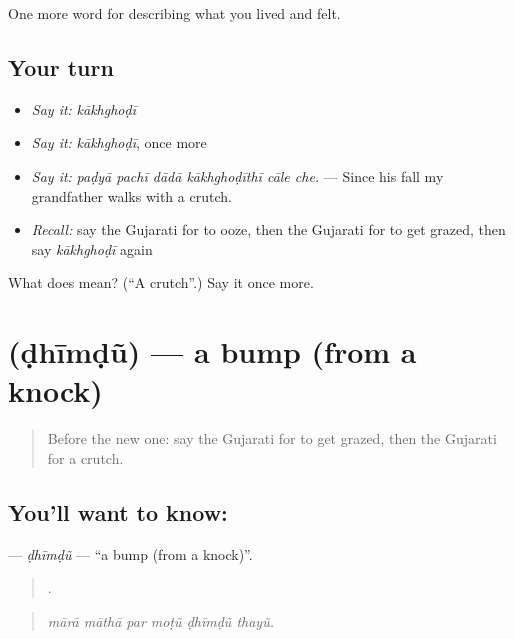 \begin{grammarlens}[title={What you've built}]
One more word for describing what you lived and felt.
\end{grammarlens}

\subsection*{Your turn}
\begin{itemize}
\raggedright
  \item \emph{Say it:} \emph{kākhghoḍī}
  \item \emph{Say it:} \emph{kākhghoḍī}, once more
  \item \emph{Say it:} \emph{paḍyā pachī dādā kākhghoḍīthī cāle che.} — Since his fall my grandfather walks with a crutch.
  \item \emph{Recall:} say the Gujarati for to ooze, then the Gujarati for to get grazed, then say \emph{kākhghoḍī} again
\end{itemize}

\begin{tcolorbox}[breakable,colback=teal!4,colframe=teal!35!black,title={Before you move on}]
What does  mean? (\textquotedblleft{}A crutch\textquotedblright{}.) Say it once more.
\end{tcolorbox}
\section[\texorpdfstring{\gu{ઢીમડું} (ḍhīmḍũ)}{ઢીમડું (ḍhīmḍũ)}]{ (ḍhīmḍũ) — a bump (from a knock)}

\label{lesson:GU-C482-dhimdu}



\begin{quote}
Before the new one: say the Gujarati for to get grazed, then the Gujarati for a crutch.
\end{quote}

\subsection*{You'll want to know: }
\textbf{} — \emph{ḍhīmḍũ} — \textquotedblleft{}a bump (from a knock)\textquotedblright{}.

\begin{quote}
     .
\end{quote}

\begin{quote}
\emph{mārā māthā par moṭũ ḍhīmḍũ thayũ.}
\end{quote}

